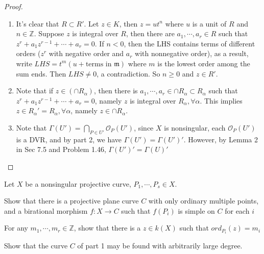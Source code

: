 \documentclass{solution}
\begin{document}
\begin{proof}
    \begin{enumerate}
        \item It's clear that $R \subset R'$. Let $z \in K$, then $z = ut^n$ where $u$ is a unit of $R$ and $n \in \mathbb{Z}$. Suppose $z$ is integral over $R$, then there are $a_1, \cdots, a_r \in R$ such that $z^{r} + a_1z^{r - 1} + \cdots + a_r = 0$. If $n \lt 0$, then the LHS contains terms of different orders ($z^r$ with negative order and $a_r$ with nonnegative order), as a result, write $LHS = t^{m}(u + \text{terms in $\mathfrak{m}$})$ where $m$ is the lowest order among the sum ends. Then $LHS \ne 0$, a contradiction. So $n \ge 0$ and $z \in R'$. 
        \item Note that if $z \in (\cap R_{\alpha})$, then there is $a_1, \cdots, a_r \in \cap R_{\alpha} \subset R_{\alpha}$ such that $z^{r} + a_1z^{r - 1} + \cdots + a_r = 0$, namely $z$ is integral over $R_{\alpha}, \forall \alpha$. This implies $z \in R_{\alpha}' = R_{\alpha}, \forall \alpha$, namely $z \in \cap R_{\alpha}$.
        \item Note that $\Gamma(U') = \bigcap\limits_{P \in U'} \mathcal{O}_{P}(U')$, since $X$ is nonsingular, each $\mathcal{O}_{P}(U')$ is a DVR, and by part 2, we have $\Gamma(U') = \Gamma(U')'$. However, by Lemma 2 in Sec 7.5 and Problem 1.46, $\Gamma(U')' = \Gamma(U)'$
    \end{enumerate}
\end{proof}

\begin{problem}{7.21}
    Let $X$ be a nonsingular projective curve, $P_1, \cdots, P_s \in X$. \begin{inparaenum}
        \item Show that there is a projective plane curve $C$ with only ordinary multiple points, and a birational morphism $f: X \rightarrow C$ such that $f(P_i)$ is simple on $C$ for each $i$
        \item For any $m_1, \cdots, m_r \in \mathbb{Z}$, show that there is a $z \in k(X)$ such that $ord_{P_i}(z) = m_i$
        \item Show that the curve $C$ of part 1 may be found with arbitrarily large degree.
    \end{inparaenum}
\end{problem}
\end{document}
